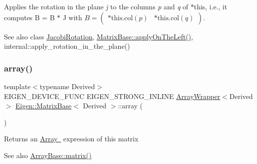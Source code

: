 Applies the rotation in the plane {\itshape j} to the columns {\itshape p} and {\itshape q} of {\ttfamily $\ast$this}, i.\+e., it computes B = B $\ast$ J with $ B = \left ( \begin{array}{cc} \text{*this.col}(p) & \text{*this.col}(q) \end{array} \right ) $.

\begin{DoxySeeAlso}{See also}
class \mbox{\hyperlink{class_eigen_1_1_jacobi_rotation}{Jacobi\+Rotation}}, \mbox{\hyperlink{class_eigen_1_1_matrix_base_a3a08ad41e81d8ad4a37b5d5c7490e765}{Matrix\+Base\+::apply\+On\+The\+Left()}}, internal\+::apply\+\_\+rotation\+\_\+in\+\_\+the\+\_\+plane() 
\end{DoxySeeAlso}
\mbox{\label{class_eigen_1_1_matrix_base_a76a9dcb91ec82fbd6e74ca2ac2ae0e07}} 
\subsubsection{\texorpdfstring{array()}{array()}\hspace{0.1cm}{\footnotesize\ttfamily [1/2]}}
{\footnotesize\ttfamily template$<$typename Derived$>$ \\
E\+I\+G\+E\+N\+\_\+\+D\+E\+V\+I\+C\+E\+\_\+\+F\+U\+NC E\+I\+G\+E\+N\+\_\+\+S\+T\+R\+O\+N\+G\+\_\+\+I\+N\+L\+I\+NE \mbox{\hyperlink{class_eigen_1_1_array_wrapper}{Array\+Wrapper}}$<$Derived$>$ \mbox{\hyperlink{class_eigen_1_1_matrix_base}{Eigen\+::\+Matrix\+Base}}$<$ Derived $>$\+::array (\begin{DoxyParamCaption}{ }\end{DoxyParamCaption})\hspace{0.3cm}{\ttfamily [inline]}}

\begin{DoxyReturn}{Returns}
an \mbox{\hyperlink{class_eigen_1_1_array_base}{Array }} expression of this matrix 
\end{DoxyReturn}
\begin{DoxySeeAlso}{See also}
\mbox{\hyperlink{class_eigen_1_1_array_base_ac513167ec762bbf639dc375d314d91d3}{Array\+Base\+::matrix()}} 
\end{DoxySeeAlso}
\mbox{\label{class_eigen_1_1_matrix_base_a3cb1d2fad4e444eaa3ebca2d7db75a5e}} 
